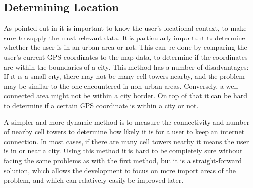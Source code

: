 \subsection{Determining Location}
As pointed out in  it is important to know the user's locational context, to make sure to supply the most relevant data. It is particularly important to determine whether the user is in an urban area or not. This can be done by comparing the user's current GPS coordinates to the map data, to determine if the coordinates are within the boundaries of a city. This method has a number of disadvantages: If it is a small city, there may not be many cell towers nearby, and the problem may be similar to the one encountered in non-urban areas. Conversely, a well connected area might not be within a city border. On top of that it can be hard to determine if a certain GPS coordinate is within a city or not.

A simpler and more dynamic method is to measure the connectivity and number of nearby cell towers to determine how likely it is for a user to keep an internet connection. In most cases, if there are many cell towers nearby it means the user is in or near a city. Using this method it is hard to be completely sure without facing the same problems as with the first method, but it is a straight-forward solution, which allows the development to focus on more import areas of the problem, and which can relatively easily be improved later.